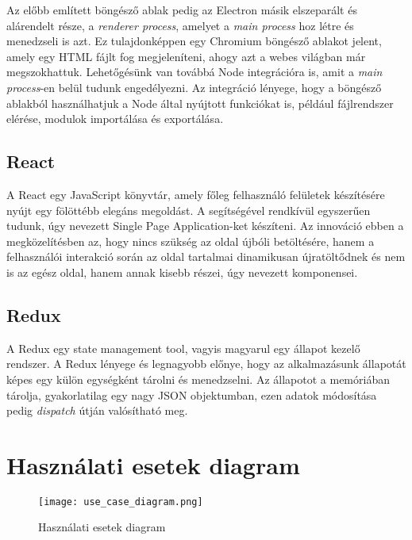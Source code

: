 Az előbb említett böngésző ablak pedig az Electron másik elszeparált és alárendelt része, a {\it renderer process}, amelyet a {\it main process} hoz létre és menedzseli is azt. Ez tulajdonképpen egy Chromium böngésző ablakot jelent, amely egy HTML fájlt fog megjeleníteni, ahogy azt a webes világban már megszokhattuk. Lehetőgésünk van továbbá Node integrációra is, amit a {\it main process}-en belül tudunk engedélyezni. Az integráció lényege, hogy a böngésző ablakból használhatjuk a Node által nyújtott funkciókat is, például fájlrendszer elérése, modulok importálása és exportálása.

\subsection{React}
A React\cite{react}  egy JavaScript könyvtár, amely főleg felhasználó felületek készítésére nyújt egy fölöttébb elegáns megoldást. A segítségével rendkívül egyszerűen tudunk, úgy nevezett Single Page Application-ket készíteni. Az innováció ebben a megközelítésben az, hogy nincs szükség az oldal újbóli betöltésére, hanem a felhasználói interakció során az oldal tartalmai dinamikusan újratöltődnek és nem is az egész oldal, hanem annak kisebb részei, úgy nevezett komponensei.

\subsection{Redux}
A Redux\cite{redux}  egy state management tool, vagyis magyarul egy állapot kezelő rendszer. A Redux lényege és legnagyobb előnye, hogy az alkalmazásunk állapotát képes egy külön egységként tárolni és menedzselni. Az állapotot a memóriában tárolja, gyakorlatilag egy nagy JSON objektumban, ezen adatok módosítása pedig {\it dispatch} útján valósítható meg.

\cleardoublepage
\section{Használati esetek diagram}
\begin{figure}[H]
	\centering
	\texttt{[image: use\_case\_diagram.png]}
	\caption{Használati esetek diagram}
	\label{fig:use_case_diagram}
\end{figure}

